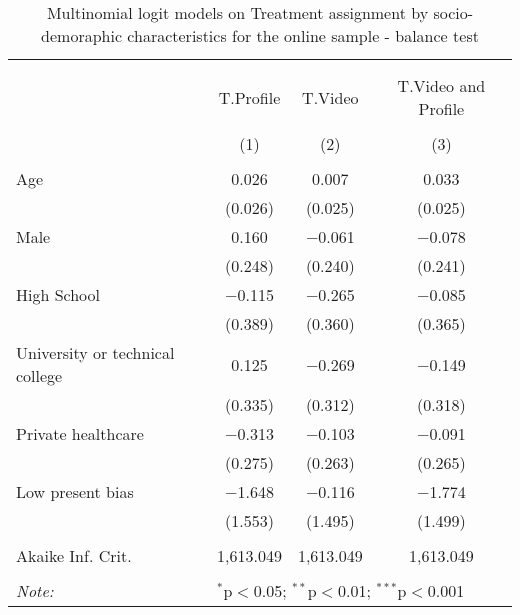
\begin{table}[H] \centering 
  \caption{Multinomial logit models on Treatment assignment by socio-demoraphic characteristics for the online sample - balance test} 
  \label{tbl:balance_online} 
\begin{tabular}{@{\extracolsep{5pt}}lccc} 
\\[-1.8ex]\hline 
\hline \\[-1.8ex] 
\\[-1.8ex] & T.Profile & T.Video & T.Video and Profile \\ 
\\[-1.8ex] & (1) & (2) & (3)\\ 
\hline \\[-1.8ex] 
 Age & 0.026 & 0.007 & 0.033 \\ 
  & (0.026) & (0.025) & (0.025) \\ 
  Male & 0.160 & $-$0.061 & $-$0.078 \\ 
  & (0.248) & (0.240) & (0.241) \\ 
  High School & $-$0.115 & $-$0.265 & $-$0.085 \\ 
  & (0.389) & (0.360) & (0.365) \\ 
  University or technical college & 0.125 & $-$0.269 & $-$0.149 \\ 
  & (0.335) & (0.312) & (0.318) \\ 
  Private healthcare & $-$0.313 & $-$0.103 & $-$0.091 \\ 
  & (0.275) & (0.263) & (0.265) \\ 
  Low present bias & $-$1.648 & $-$0.116 & $-$1.774 \\ 
  & (1.553) & (1.495) & (1.499) \\ 
 \hline \\[-1.8ex] 
Akaike Inf. Crit. & 1,613.049 & 1,613.049 & 1,613.049 \\ 
\hline 
\hline \\[-1.8ex] 
\textit{Note:}  & \multicolumn{3}{l}{$^{*}$p$<$0.05; $^{**}$p$<$0.01; $^{***}$p$<$0.001} \\ 
\end{tabular} 
\end{table} 
